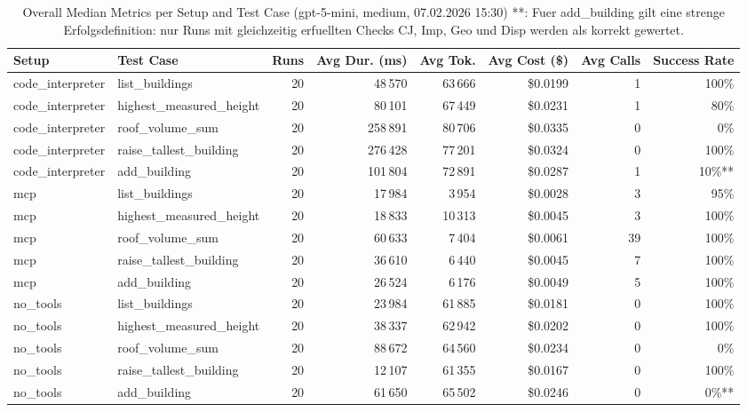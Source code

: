 \documentclass[a4paper,11pt]{article}
\begin{document}
\begin{table}[H]
\centering
\scriptsize
\caption{Overall Median Metrics per Setup and Test Case (gpt-5-mini, medium, 07.02.2026 15:30) **: Fuer add\_building gilt eine strenge Erfolgsdefinition: nur Runs mit gleichzeitig erfuellten Checks CJ, Imp, Geo und Disp werden als korrekt gewertet.}
\begin{tabular}{l l r r r r r r}
\toprule
Setup & Test Case & Runs & Avg Dur. (ms) & Avg Tok. & Avg Cost (\$) & Avg Calls & Success Rate \\
\midrule
code\_interpreter & list\_buildings & 20 & 48\,570 & 63\,666 & \$0.0199 & 1 & 100\% \\
code\_interpreter & highest\_measured\_height & 20 & 80\,101 & 67\,449 & \$0.0231 & 1 & 80\% \\
code\_interpreter & roof\_volume\_sum & 20 & 258\,891 & 80\,706 & \$0.0335 & 0 & 0\% \\
code\_interpreter & raise\_tallest\_building & 20 & 276\,428 & 77\,201 & \$0.0324 & 0 & 100\% \\
code\_interpreter & add\_building & 20 & 101\,804 & 72\,891 & \$0.0287 & 1 & 10\%** \\
\midrule
mcp & list\_buildings & 20 & 17\,984 & 3\,954 & \$0.0028 & 3 & 95\% \\
mcp & highest\_measured\_height & 20 & 18\,833 & 10\,313 & \$0.0045 & 3 & 100\% \\
mcp & roof\_volume\_sum & 20 & 60\,633 & 7\,404 & \$0.0061 & 39 & 100\% \\
mcp & raise\_tallest\_building & 20 & 36\,610 & 6\,440 & \$0.0045 & 7 & 100\% \\
mcp & add\_building & 20 & 26\,524 & 6\,176 & \$0.0049 & 5 & 100\% \\
\midrule
no\_tools & list\_buildings & 20 & 23\,984 & 61\,885 & \$0.0181 & 0 & 100\% \\
no\_tools & highest\_measured\_height & 20 & 38\,337 & 62\,942 & \$0.0202 & 0 & 100\% \\
no\_tools & roof\_volume\_sum & 20 & 88\,672 & 64\,560 & \$0.0234 & 0 & 0\% \\
no\_tools & raise\_tallest\_building & 20 & 12\,107 & 61\,355 & \$0.0167 & 0 & 100\% \\
no\_tools & add\_building & 20 & 61\,650 & 65\,502 & \$0.0246 & 0 & 0\%** \\
\bottomrule
\end{tabular}
\end{table}

\clearpage
\end{document}
